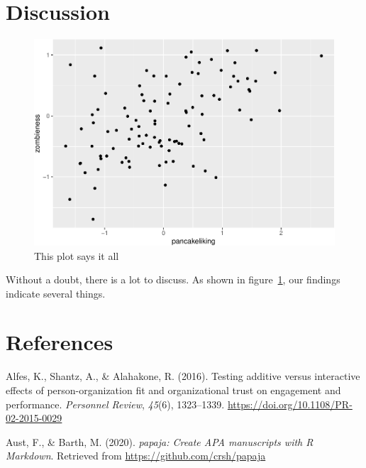 \documentclass[english,man]{apa6}
\begin{document}
\hypertarget{discussion}{%
\section{Discussion}\label{discussion}}

\begin{figure}

{\centering \includegraphics{testpaper_files/figure-latex/firstplot-1} 

}

\caption{This plot says it all}\label{fig:firstplot}
\end{figure}

Without a doubt, there is a lot to discuss.
As shown in figure~\ref{fig:firstplot}, our findings indicate several things.

\newpage

\hypertarget{references}{%
\section{References}\label{references}}

\begingroup
\setlength{\parindent}{-0.5in}
\setlength{\leftskip}{0.5in}

\hypertarget{refs}{}
\leavevmode\hypertarget{ref-alfesTestingAdditiveInteractive2016}{}%
Alfes, K., Shantz, A., \& Alahakone, R. (2016). Testing additive versus interactive effects of person-organization fit and organizational trust on engagement and performance. \emph{Personnel Review}, \emph{45}(6), 1323--1339. \url{https://doi.org/10.1108/PR-02-2015-0029}

\leavevmode\hypertarget{ref-R-papaja}{}%
Aust, F., \& Barth, M. (2020). \emph{papaja: Create APA manuscripts with R Markdown}. Retrieved from \url{https://github.com/crsh/papaja}
\end{document}

